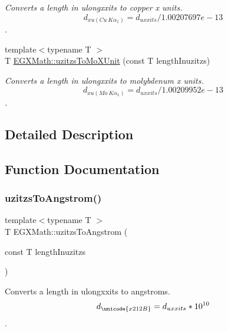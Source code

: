 \begin{DoxyCompactItemize}
\begin{DoxyCompactList}\small\item\em Converts a length in ulongxxits to copper x units. \[ d_{xu(Cu\ K\alpha_1)}=d_{uxxits} / 1.00207697e-13 \]. \end{DoxyCompactList}\item 
{\footnotesize template$<$typename T $>$ }\\T \mbox{\hyperlink{group___e_g_x_math-_conversions-_length_conversions-uzitzs-_non-_s_i_ga64b556911b0bb06cf315aa02f5e2d379}{E\+G\+X\+Math\+::uzitzs\+To\+Mo\+X\+Unit}} (const T length\+Inuzitzs)
\begin{DoxyCompactList}\small\item\em Converts a length in ulongxxits to molybdenum x units. \[ d_{xu(Mo\ K\alpha_1)}=d_{uxxits} / 1.00209952e-13 \]. \end{DoxyCompactList}\end{DoxyCompactItemize}


\subsection{Detailed Description}


\subsection{Function Documentation}
\mbox{\label{group___e_g_x_math-_conversions-_length_conversions-uzitzs-_non-_s_i_gaaaecee65b1db5abcc71e18526e7073eb}} 
\subsubsection{\texorpdfstring{uzitzs\+To\+Angstrom()}{uzitzsToAngstrom()}}
{\footnotesize\ttfamily template$<$typename T $>$ \\
T E\+G\+X\+Math\+::uzitzs\+To\+Angstrom (\begin{DoxyParamCaption}\item[{const T}]{length\+Inuzitzs }\end{DoxyParamCaption})}



Converts a length in ulongxxits to angstroms. \[ d_{\unicode{x212B}}=d_{uxxits} * 10^{10} \]. 

